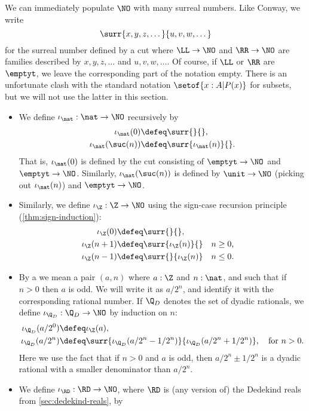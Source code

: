 We can immediately populate $\NO$ with many surreal numbers.
Like Conway, we write
\[\surr{x,y,z,\dots}{u,v,w,\dots}\]
for the surreal number defined by a cut where $\LL\to\NO$ and $\RR\to\NO$ are families described by $x,y,z,\dots$ and $u,v,w,\dots$.
Of course, if $\LL$ or $\RR$ are $\emptyt$, we leave the corresponding part of the notation empty.
There is an unfortunate clash with the standard notation $\setof{x:A | P(x)}$ for subsets, but we will not use the latter in this section.
\begin{itemize}
\item We define $\iota_{\nat}:\nat\to\NO$ recursively by
  \begin{align*}
    \iota_{\nat}(0) &\defeq \surr{}{},\\
    \iota_\nat(\suc(n)) &\defeq \surr{\iota_\nat(n)}{}.
  \end{align*}
  That is, $\iota_\nat(0)$ is defined by the cut consisting of $\emptyt\to\NO$ and $\emptyt\to\NO$.
  Similarly, $\iota_\nat(\suc(n))$ is defined by $\unit\to\NO$ (picking out $\iota_\nat(n)$) and $\emptyt\to\NO$.
\item Similarly, we define $\iota_{\Z}:\Z\to\NO$ using the sign-case recursion principle (\cref{thm:sign-induction}):
  \begin{align*}
    \iota_{\Z}(0) &\defeq \surr{}{},\\
    \iota_\Z(n+1) &\defeq \surr{\iota_\Z(n)}{} & &\text{$n\ge 0$,}\\
    \iota_\Z(n-1) &\defeq \surr{}{\iota_\Z(n)} & &\text{$n\le 0$.}
  \end{align*}
\item By a 
  we mean a pair $(a,n)$ where $a:\Z$ and $n:\nat$, and such that if $n>0$ then $a$ is odd.
  We will write it as $a/2^n$, and identify it with the corresponding rational number.
  If $\Q_D$ denotes the set of dyadic rationals, we define $\iota_{\Q_D}:\Q_D\to\NO$ by induction on $n$:
  \begin{align*}
    \iota_{\Q_D}(a/2^0) &\defeq \iota_\Z(a),\\
    \iota_{\Q_D}(a/2^n) &\defeq \surr{\iota_{\Q_D}(a/2^n - 1/2^n)}{\iota_{\Q_D}(a/2^n + 1/2^n)},
    \quad \text{for $n>0$.}
  \end{align*}
  Here we use the fact that if $n>0$ and $a$ is odd, then $a/2^n \pm 1/2^n$ is a dyadic rational with a smaller denominator than $a/2^n$.
\item We define $\iota_{\RD}:\RD\to\NO$,\label{reals-into-surreals} where $\RD$ is (any version of) the Dedekind reals from \cref{sec:dedekind-reals}, by

\end{itemize}

